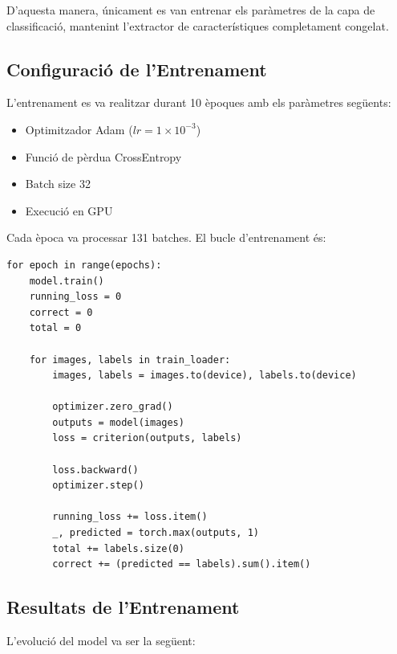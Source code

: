 \documentclass[12pt,a4paper]{article}
\begin{document}
D’aquesta manera, únicament es van entrenar els paràmetres de la capa de classificació,
mantenint l’extractor de característiques completament congelat.

\subsection{Configuració de l’Entrenament}

L’entrenament es va realitzar durant 10 èpoques amb els paràmetres següents:

\begin{itemize}
    \item Optimitzador Adam ($lr=1 \times 10^{-3}$)
    \item Funció de pèrdua CrossEntropy
    \item Batch size 32
    \item Execució en GPU
\end{itemize}

Cada època va processar 131 batches. El bucle d’entrenament és:

\begin{lstlisting}[style=mypython]
for epoch in range(epochs):
    model.train()
    running_loss = 0
    correct = 0
    total = 0

    for images, labels in train_loader:
        images, labels = images.to(device), labels.to(device)

        optimizer.zero_grad()
        outputs = model(images)
        loss = criterion(outputs, labels)

        loss.backward()
        optimizer.step()

        running_loss += loss.item()
        _, predicted = torch.max(outputs, 1)
        total += labels.size(0)
        correct += (predicted == labels).sum().item()
\end{lstlisting}

\subsection{Resultats de l’Entrenament}

L’evolució del model va ser la següent:
\end{document}
